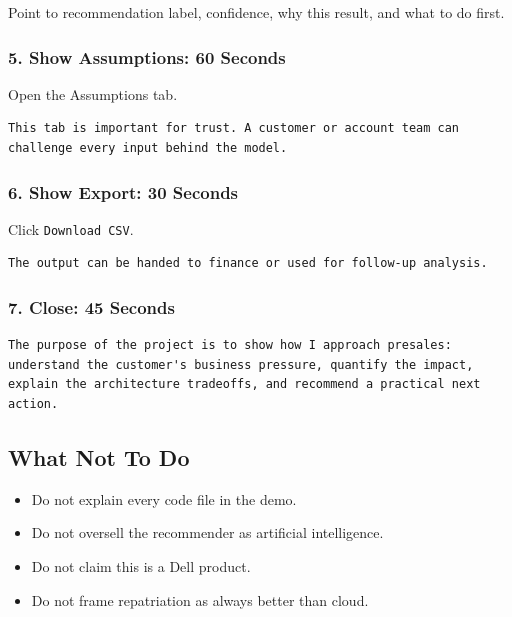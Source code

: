 \documentclass[11pt,a4paper]{article}
\begin{document}
Point to recommendation label, confidence, why this result, and what to do first.

\subsubsection{5. Show Assumptions: 60 Seconds}

Open the Assumptions tab.

\begin{lstlisting}
This tab is important for trust. A customer or account team can challenge every input behind the model.
\end{lstlisting}

\subsubsection{6. Show Export: 30 Seconds}

Click \texttt{Download CSV}.

\begin{lstlisting}
The output can be handed to finance or used for follow-up analysis.
\end{lstlisting}

\subsubsection{7. Close: 45 Seconds}

\begin{lstlisting}
The purpose of the project is to show how I approach presales: understand the customer's business pressure, quantify the impact, explain the architecture tradeoffs, and recommend a practical next action.
\end{lstlisting}

\subsection{What Not To Do}

\begin{itemize}
  \item Do not explain every code file in the demo.
  \item Do not oversell the recommender as artificial intelligence.
  \item Do not claim this is a Dell product.
  \item Do not frame repatriation as always better than cloud.
\end{itemize}
\end{document}

